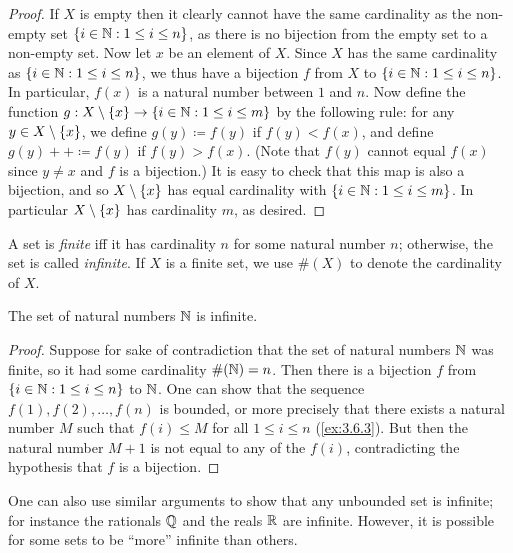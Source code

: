 \begin{proof}
	If \(X\) is empty then it clearly cannot have the same cardinality as the non-empty set \(\left\lbrace i \in \mathbb{N} : 1 \leq i \leq n\right\rbrace\), as there is no bijection from the empty set to a non-empty set.
	Now let \(x\) be an element of \(X\).
	Since \(X\) has the same cardinality as \(\left\lbrace i \in \mathbb{N} : 1 \leq i \leq n\right\rbrace\), we thus have a bijection \(f\) from \(X\) to \(\left\lbrace i \in \mathbb{N} : 1 \leq i \leq n\right\rbrace\).
	In particular, \(f(x)\) is a natural number between \(1\) and \(n\).
	Now define the function \(g : X \setminus \left\lbrace x\right\rbrace \to \left\lbrace i \in \mathbb{N} : 1 \leq i \leq m\right\rbrace\) by the following rule: for any \(y \in X \setminus \left\lbrace x\right\rbrace\), we define \(g(y) \coloneqq f(y)\) if \(f(y) < f(x)\), and define \(g(y)++ \coloneqq f(y)\) if \(f(y) > f(x)\).
	(Note that \(f(y)\) cannot equal \(f(x)\) since \(y \neq x\) and \(f\) is a bijection.)
	It is easy to check that this map is also a bijection, and so \(X \setminus \left\lbrace x\right\rbrace\) has equal cardinality with \(\left\lbrace i \in \mathbb{N} : 1 \leq i \leq m\right\rbrace\).
	In particular \(X \setminus \left\lbrace x\right\rbrace\) has cardinality \(m\), as desired.
\end{proof}

\begin{defn}\label{3.6.10}
	A set is \emph{finite} iff it has cardinality \(n\) for some natural number \(n\);
	otherwise, the set is called \emph{infinite}.
	If \(X\) is a finite set, we use \(\#(X)\) to denote the cardinality of \(X\).
\end{defn}

\setcounter{thm}{11}
\begin{thm}\label{3.6.12}
	The set of natural numbers \(\mathbb{N}\) is infinite.
\end{thm}

\begin{proof}
	Suppose for sake of contradiction that the set of natural numbers \(\mathbb{N}\) was finite, so it had some cardinality \(\#(\mathbb{N}) = n\).
	Then there is a bijection \(f\) from \(\left\lbrace i \in \mathbb{N} : 1 \leq i \leq n\right\rbrace\) to \(\mathbb{N}\).
	One can show that the sequence \(f(1), f(2), \dots, f(n)\) is bounded, or more precisely that there exists a natural number \(M\) such that \(f(i) \leq M\) for all \(1 \leq i \leq n\) (\cref{ex:3.6.3}).
	But then the natural number \(M+1\) is not equal to any of the \(f(i)\), contradicting the hypothesis that \(f\) is a bijection.
\end{proof}

\begin{rmk}\label{3.6.13}
	One can also use similar arguments to show that any unbounded set is infinite;
	for instance the rationals \(\mathbb{Q}\) and the reals \(\mathbb{R}\) are infinite.
	However, it is possible for some sets to be ``more'' infinite than others.
\end{rmk}

